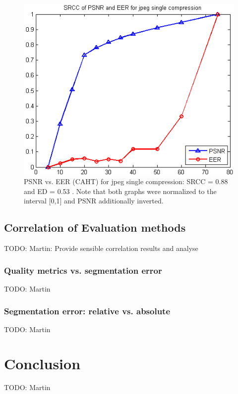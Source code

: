 \documentclass[10pt,twocolumn,letterpaper]{article}
\begin{document}
\begin{figure}[h]
	\begin{center}
		
	\includegraphics[width=1\linewidth]{img/corrSRCCproblem}
\end{center}
	\caption{PSNR vs. EER (CAHT) for jpeg single compression: SRCC = 0.88 and ED = 0.53 . Note that both graphs were normalized to the interval [0,1] and PSNR additionally inverted.}
	\label{fig:corrSRCCproblem}
	
\end{figure}



\subsection{Correlation of Evaluation methods}
TODO: Martin:
Provide sensible correlation results and analyse

\subsubsection{Quality metrics vs. segmentation error}
TODO: Martin

\subsubsection{Segmentation error: relative vs. absolute}
TODO: Martin


\section{Conclusion}
\label{section:conclusion}
TODO: Martin 

{\small


}
\end{document}

